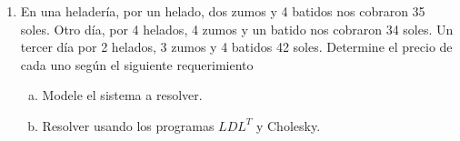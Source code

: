 \documentclass[
	spanish,
	8pt,
	utf8,
	xcolor=table,
	handout,
	aspectratio=169,
	professionalfonts,
	notheorems,
	mathserif,
]{beamer}
\newcounter{savedenum}
\newcommand*{\saveenum}{\setcounter{savedenum}{\theenumi}}
\begin{document}
\begin{frame}
\begin{enumerate}
		\item

		      En una heladería, por un helado, dos zumos y 4 batidos nos cobraron 35 soles.
		      Otro día, por 4 helados, 4 zumos y un batido nos cobraron 34 soles.
		      Un tercer día por 2 helados, 3 zumos y 4 batidos 42 soles.
		      Determine el precio de cada uno según el siguiente requerimiento

		      \begin{multicols}{2}

			      \begin{enumerate}[a)]
				      \item

				            Modele el sistema a resolver.

				      \item

				            Resolver usando los programas $LDL^{T}$ y Cholesky.
			      \end{enumerate}
		      \end{multicols}

		      \saveenum
	\end{enumerate}
\end{frame}
\end{document}
